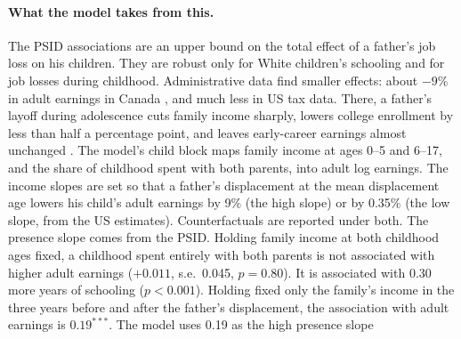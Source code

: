 \paragraph{What the model takes from this.} The PSID associations are an upper bound on the total effect of a father's
job loss on his children. They are robust only for White children's schooling and for job losses during childhood.
Administrative data find smaller effects: about $-9\%$ in adult earnings in Canada
\citep{oreopoulos2008intergenerational}, and much less in US tax data. There, a father's layoff during adolescence
cuts family income sharply, lowers college enrollment by less than half a percentage point, and leaves early-career
earnings almost unchanged \citep{hilger2016parental}. The model's child block maps family income at ages 0--5 and
6--17, and the share of childhood spent with both parents, into adult log earnings. The income slopes are set so that
a father's displacement at the mean displacement age lowers his child's adult earnings by 9\% (the high slope) or by
0.35\% (the low slope, from the US estimates). Counterfactuals are reported under both. The presence slope comes from
the PSID. Holding family income at both childhood ages fixed, a childhood spent entirely with both parents is not
associated with higher adult earnings ($+0.011$, s.e.\ 0.045, $p=0.80$). It is associated with 0.30 more years of
schooling ($p<0.001$). Holding fixed only the family's income in the three years before and after the father's
displacement, the association with adult earnings is $0.19^{***}$. The model uses 0.19 as the high presence slope
